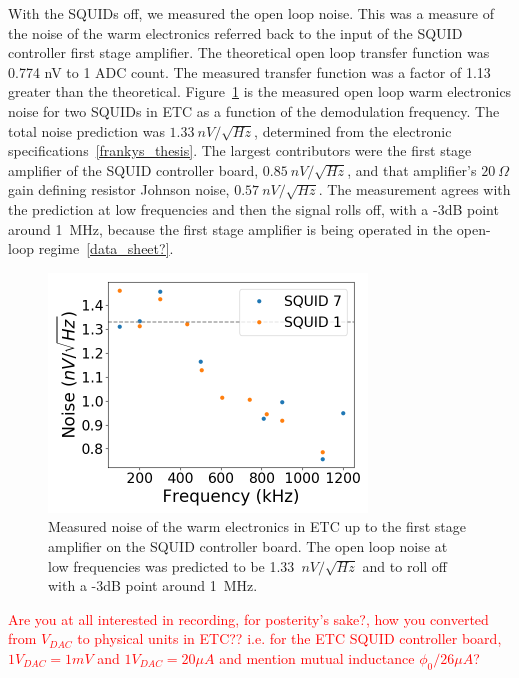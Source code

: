 With the \ac{SQUID}s off, we measured the open loop noise.
This was a measure of the noise of the warm electronics referred back to the input of the \ac{SQUID} controller first stage amplifier. 
The theoretical open loop transfer function was 0.774 nV to 1 \ac{ADC} count. 
The measured transfer function was a factor of 1.13 greater than the theoretical. 
Figure~\ref{fig:dark_electronic_noise} is the measured open loop warm electronics noise for two \ac{SQUID}s in \ac{ETC} as a function of the demodulation frequency. 
The total noise prediction was $1.33~nV/\sqrt{Hz}$, determined from the electronic specifications~\ref{frankys_thesis}. 
The largest contributors were the first stage amplifier of the \ac{SQUID} controller board, $0.85~nV/\sqrt{Hz}$, and that amplifier's $20~\Omega$ gain defining resistor Johnson noise, $0.57~nV/\sqrt{Hz}$. 
The measurement agrees with the prediction at low frequencies and then the signal rolls off, with a -3dB point around 1~MHz, because the first stage amplifier is being operated in the open-loop regime~\ref{data_sheet?}.  


\begin{figure}[ht!]
\begin{center}
\includegraphics[height=2.5in]{figures/warm_electronic_noise.png}
\caption{Measured noise of the warm electronics in \ac{ETC} up to the first stage amplifier on the \ac{SQUID} controller board. The open loop noise at low frequencies was predicted to be 1.33~$nV/\sqrt{Hz}$ and to roll off with a -3dB point around 1~MHz. 
\label{fig:dark_electronic_noise} }
\end{center}
\end{figure}


\textcolor{red}{Are you at all interested in recording, for posterity's sake?, how you converted from $V_{DAC}$ to physical units in \ac{ETC}?? i.e. for the \ac{ETC} \ac{SQUID} controller board, $1 V_{DAC} = 1 mV$ and $1 V_{DAC} = 20 \mu A$ and mention mutual inductance $\phi_{0}/26 \mu A$?}

